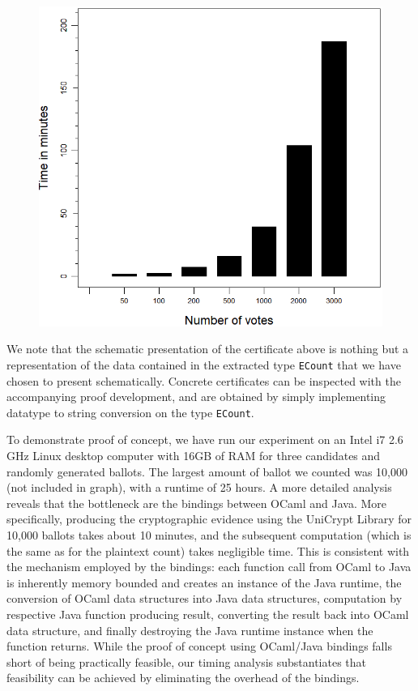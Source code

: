 \begin{figure}
\centering
\includegraphics[scale=0.50]{PlotVer3.png}
\end{figure}
 We note that the schematic presentation of the certificate above is
 nothing but a representation of the data contained in the extracted
 type \texttt{ECount} that we have chosen to present schematically.
 Concrete certificates can be inspected with the accompanying proof
 development, and are obtained by simply implementing datatype to
 string conversion on the type \texttt{ECount}.
 



To demonstrate proof of concept, 
we have run our experiment on an  Intel  i7  2.6  GHz  Linux  desktop  computer
with  16GB  of  RAM for three candidates and randomly generated ballots. The 
largest  amount of ballot we counted was 10,000 (not included in
graph), with a runtime of 25 hours. A more detailed analysis reveals
that the bottleneck are the bindings between OCaml and Java. More
specifically, producing the cryptographic evidence using the
UniCrypt Library for 10,000 ballots takes about 10 minutes, and the
subsequent computation (which is the same as for the plaintext
count) takes negligible time. This is consistent with the mechanism
employed by the bindings:
each function call from OCaml to Java is inherently memory bounded
and creates an instance of the Java runtime, 
the conversion of OCaml data structures into Java data
structures, 
computation by respective Java function producing result,
converting the result back into OCaml data structure, and finally destroying 
the Java runtime instance when the function returns. While the proof
of concept using OCaml/Java bindings falls short of being
practically feasible, our timing analysis substantiates that
feasibility can be achieved by eliminating the overhead of the
bindings. 


